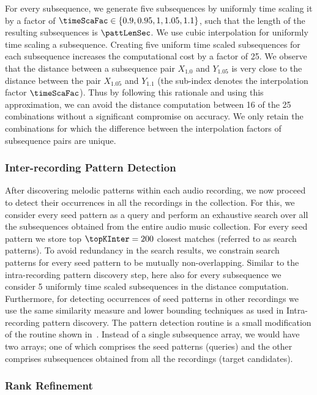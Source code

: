 For every subsequence, we generate five subsequences by uniformly time scaling it by a factor of $\timeScaFac \in \lbrace 0.9, 0.95, 1, 1.05, 1.1\rbrace$, such that the length of the resulting subsequences is $\pattLenSec$. We use cubic interpolation for uniformly time scaling a subsequence. Creating five uniform time scaled subsequences for each subsequence increases the computational cost by a factor of 25. We observe that the distance between a subsequence pair $X_{1.0}$ and $Y_{1.05}$ is very close to the distance between the pair $X_{1.05}$ and $Y_{1.1}$ (the sub-index denotes the interpolation factor $\timeScaFac$). Thus by following this rationale and using this approximation, we can avoid the distance computation between 16 of the 25 combinations without a significant compromise on accuracy. We only retain the combinations for which the difference between the interpolation factors of subsequence pairs are unique.

\subsubsection{Inter-recording Pattern Detection}
\label{sec:inter_recording_pattern_search}

After discovering melodic patterns within each audio recording, we now proceed to detect their occurrences in all the recordings in the collection. For this, we consider every seed pattern as a query and perform an exhaustive search over all the subsequences obtained from the entire audio music collection. For every seed pattern we store top $\topKInter=200$ closest matches (referred to as search patterns). To avoid redundancy in the search results, we constrain search patterns for every seed pattern to be mutually non-overlapping. Similar to the intra-recording pattern discovery step, here also for every subsequence we consider 5 uniformly time scaled subsequences in the distance computation. Furthermore, for detecting occurrences of seed patterns in other recordings we use the same similarity measure and lower bounding techniques as used in Intra-recording pattern discovery. The pattern detection routine is a small modification of the routine shown in~. Instead of a single subsequence array, we would have two arrays; one of which comprises the seed patterns (queries) and the other comprises subsequences obtained from all the recordings (target candidates). 

\subsubsection{Rank Refinement}
\label{sec:rankRefinement}

